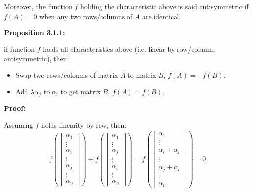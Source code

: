 \documentclass{article}
\begin{document}
Moreover, the function \(f\) holding the characteristic above is
said antisymmetric if
\(f(A)=0\) when any two rows/columns of \(A\) are identical. 

\vspace{2mm}
\textbf{Proposition 3.1.1:}

if function \(f\) holds all characteristics above (i.e. linear
by row/column, antisymmetric), then:

\begin{itemize}
    \item Swap two rows/coloums of matrix \(A\) to matrix \(B\),
    \(f(A)=-f(B)\).
    \item Add \(\lambda\alpha_j\) to \(\alpha_i\) to get matrix \(B\),
    \(f(A)=f(B)\).
\end{itemize}

\vspace{2mm}
\textbf{Proof:}

Assuming \(f\) holds linearity by row, then:
\begin{equation}
\begin{split}
f(
\begin{bmatrix}
    \alpha_1 \\
    \vdots \\
    \alpha_i \\
    \vdots \\
    \alpha_j \\
    \vdots \\
    \alpha_n
\end{bmatrix}) + 
f(\begin{bmatrix}
    \alpha_1 \\
    \vdots \\
    \alpha_j \\
    \vdots \\
    \alpha_i \\
    \vdots \\
    \alpha_n
\end{bmatrix})
=
f(\begin{bmatrix}
    \alpha_1 \\
    \vdots \\
    \alpha_i + \alpha_j \\
    \vdots \\
    \alpha_j + \alpha_i \\
    \vdots \\
    \alpha_n
\end{bmatrix})=0
\end{split}
\end{equation}
\end{document}
